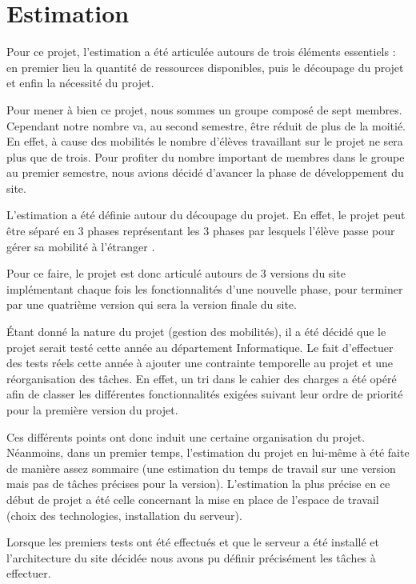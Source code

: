\chapter{Estimation}

Pour ce projet, l'estimation a été articulée autours de trois éléments essentiels : en premier lieu la quantité de ressources disponibles, puis le découpage du projet et enfin la nécessité du projet.

\smallbreak

Pour mener à bien ce projet, nous sommes un groupe composé de sept membres. Cependant notre nombre va, au second semestre, être réduit de plus de la moitié. En effet, à cause des mobilités le nombre d'élèves travaillant sur le projet ne sera plus que de trois. Pour profiter du nombre important de membres dans le groupe au premier semestre, nous avions décidé d'avancer la phase de développement du site. 

\smallbreak

L'estimation a été définie autour du découpage du projet. En effet, le projet peut être séparé en 3 phases représentant les 3 phases par lesquels l'élève passe pour gérer sa mobilité à l'étranger . 

Pour ce faire, le projet est donc articulé autours de 3 versions du site implémentant chaque fois les fonctionnalités d'une nouvelle phase, pour terminer par une quatrième version qui sera la version finale du site.

\smallbreak

Étant donné la nature du projet (gestion des mobilités), il a été décidé que le projet serait testé cette année au département Informatique. Le fait d'effectuer des tests réels cette année à ajouter une contrainte temporelle au projet et une réorganisation des tâches. En effet, un tri dans le cahier des charges a été opéré afin de classer les différentes fonctionnalités exigées suivant leur ordre de priorité pour la première version du projet.

\bigbreak

Ces différents points ont donc induit une certaine organisation du projet. Néanmoins, dans un premier temps, l'estimation du projet en lui-même à été faite de manière assez sommaire (une estimation du temps de travail sur une version mais pas de tâches précises pour la version). L'estimation la plus précise en ce début de projet a été celle concernant la mise en place de l'espace de travail (choix des technologies, installation du serveur). 

Lorsque les premiers tests ont été effectués et que le serveur a été installé et l'architecture du site décidée nous avons pu définir précisément les tâches à effectuer.